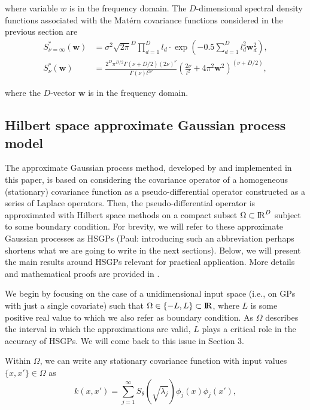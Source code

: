 \documentclass[]{interact}
\theoremstyle{plain}%
\theoremstyle{definition}
\theoremstyle{remark}
\begin{document}
\noindent where variable $w$ is in the frequency domain. The $D$-dimensional spectral density functions associated with the Mat\'ern covariance functions considered in the previous section are
%
\begin{align}
S^{\ast}_{\nu=\infty}(\mathbf{w})&= \sigma^2 \sqrt{2\pi}^D \prod_{d=1}^D l_d \cdot \exp\left(-0.5 \sum_{d=1}^D l_d^2 \mathbf{w}_d^2\right), \nonumber \\
%
S^{\ast}_{\nu}(\mathbf{w})&= \frac{2^D\pi^{D/2}\Gamma(\nu+D/2)(2\nu)^{\nu}}{\Gamma(\nu)l^{2\nu}}\left(\frac{2\nu}{l^2}+4\pi^2\mathbf{w}^2 \right)^{(\nu+D/2)}, \nonumber
\end{align}

\noindent where the $D$-vector $\mathbf{w}$ is in the frequency domain.

\subsection{Hilbert space approximate Gaussian process model}

The approximate Gaussian process method, developed by \cite{solin2018hilbert} and implemented in this paper, is based on considering the covariance operator of a homogeneous (stationary) covariance function as a pseudo-differential operator constructed as a series of Laplace operators. Then, the pseudo-differential operator is approximated with Hilbert space methods on a compact subset $\Omega \subset {\rm I\!R}^D$ subject to some boundary condition. For brevity, we will refer to these approximate Gaussian processes as HSGPs (Paul: introducing such an abbreviation perhaps shortens what we are going to write in the next sections). Below, we will present the main results around HSGPs relevant for practical application. More details and mathematical proofs are provided in \cite{solin2018hilbert}.

We begin by focusing on the case of a unidimensional input space (i.e., on GPs with just a single covariate) such that $\Omega \in \{-L,L\} \subset {\rm I\!R}$, where $L$ is some positive real value to which we also refer as boundary condition. As $\Omega$ describes the interval in which the approximations are valid, $L$ plays a critical role in the accuracy of HSGPs. We will come back to this issue in Section 3.

Within $\Omega$, we can write any stationary covariance function with input values $\{x,x'\} \in \Omega$ as 
%
\begin{equation}\label{approxcov}
k(x,x') = \sum_{j=1}^\infty S_{\theta}(\sqrt{\lambda_j}) \phi_j(x) \phi_j(x'),
\end{equation} 
\end{document}
